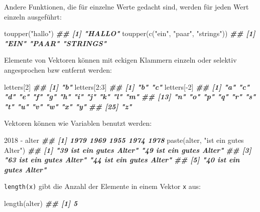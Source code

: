 \documentclass[11pt,german,a4paper]{article}
\newenvironment{Shaded}{\begin{snugshade}}{\end{snugshade}}
\newcommand{\DecValTok}[1]{\textcolor[rgb]{0.00,0.00,0.81}{#1}}
\newcommand{\DocumentationTok}[1]{\textcolor[rgb]{0.56,0.35,0.01}{\textbf{\textit{#1}}}}
\newcommand{\FunctionTok}[1]{\textcolor[rgb]{0.00,0.00,0.00}{#1}}
\newcommand{\NormalTok}[1]{#1}
\newcommand{\SpecialCharTok}[1]{\textcolor[rgb]{0.00,0.00,0.00}{#1}}
\newcommand{\StringTok}[1]{\textcolor[rgb]{0.31,0.60,0.02}{#1}}
\begin{document}
Andere Funktionen, die für einzelne Werte gedacht sind, werden für jeden Wert einzeln ausgeführt:

\begin{Shaded}
\begin{Highlighting}[]
\FunctionTok{toupper}\NormalTok{(}\StringTok{"hallo"}\NormalTok{)}
\DocumentationTok{\#\# [1] "HALLO"}
\FunctionTok{toupper}\NormalTok{(}\FunctionTok{c}\NormalTok{(}\StringTok{"ein"}\NormalTok{, }\StringTok{"paar"}\NormalTok{, }\StringTok{"strings"}\NormalTok{))}
\DocumentationTok{\#\# [1] "EIN"     "PAAR"    "STRINGS"}
\end{Highlighting}
\end{Shaded}

Elemente von Vektoren können mit eckigen Klammern einzeln oder selektiv angesprochen bzw entfernt werden:

\begin{Shaded}
\begin{Highlighting}[]
\NormalTok{letters[}\DecValTok{2}\NormalTok{]}
\DocumentationTok{\#\# [1] "b"}
\NormalTok{letters[}\DecValTok{2}\SpecialCharTok{:}\DecValTok{3}\NormalTok{]}
\DocumentationTok{\#\# [1] "b" "c"}
\NormalTok{letters[}\SpecialCharTok{{-}}\DecValTok{2}\NormalTok{]}
\DocumentationTok{\#\#  [1] "a" "c" "d" "e" "f" "g" "h" "i" "j" "k" "l" "m"}
\DocumentationTok{\#\# [13] "n" "o" "p" "q" "r" "s" "t" "u" "v" "w" "x" "y"}
\DocumentationTok{\#\# [25] "z"}
\end{Highlighting}
\end{Shaded}

Vektoren können wie Variablen benutzt werden:

\begin{Shaded}
\begin{Highlighting}[]
\DecValTok{2018} \SpecialCharTok{{-}}\NormalTok{ alter}
\DocumentationTok{\#\# [1] 1979 1969 1955 1974 1978}
\FunctionTok{paste}\NormalTok{(alter, }\StringTok{"ist ein gutes Alter"}\NormalTok{)}
\DocumentationTok{\#\# [1] "39 ist ein gutes Alter" "49 ist ein gutes Alter"}
\DocumentationTok{\#\# [3] "63 ist ein gutes Alter" "44 ist ein gutes Alter"}
\DocumentationTok{\#\# [5] "40 ist ein gutes Alter"}
\end{Highlighting}
\end{Shaded}

\texttt{length(x)} gibt die Anzahl der Elemente in einem Vektor \texttt{x} aus:

\begin{Shaded}
\begin{Highlighting}[]
\FunctionTok{length}\NormalTok{(alter)}
\DocumentationTok{\#\# [1] 5}
\end{Highlighting}
\end{Shaded}
\end{document}
